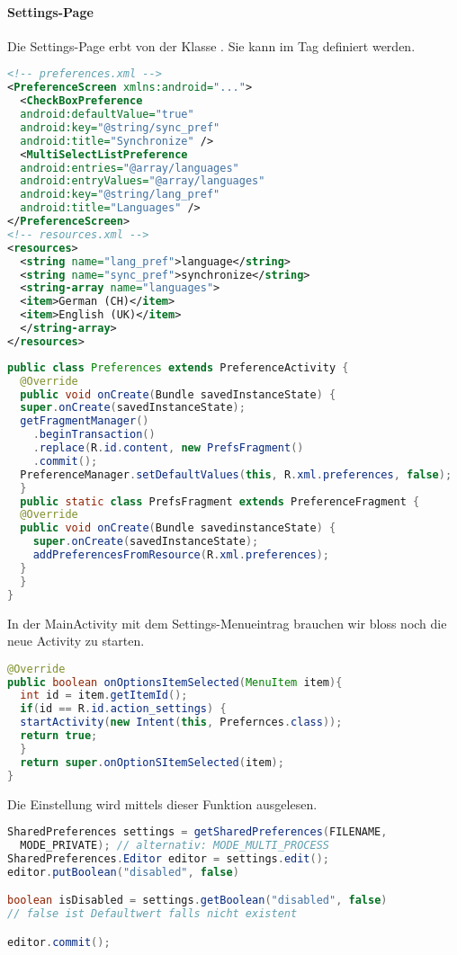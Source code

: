 \paragraph{Settings-Page} Die Settings-Page erbt von der Klasse . Sie kann im  Tag definiert werden.
\begin{lstlisting}[language=xml]
<!-- preferences.xml -->
<PreferenceScreen xmlns:android="...">
  <CheckBoxPreference
  android:defaultValue="true"
  android:key="@string/sync_pref"
  android:title="Synchronize" />
  <MultiSelectListPreference
  android:entries="@array/languages"
  android:entryValues="@array/languages"
  android:key="@string/lang_pref"
  android:title="Languages" />
</PreferenceScreen>
<!-- resources.xml -->
<resources>
  <string name="lang_pref">language</string>
  <string name="sync_pref">synchronize</string>
  <string-array name="languages">
  <item>German (CH)</item>
  <item>English (UK)</item>
  </string-array>
</resources>
\end{lstlisting}
\begin{lstlisting}[language=java]
public class Preferences extends PreferenceActivity {
  @Override
  public void onCreate(Bundle savedInstanceState) {
  super.onCreate(savedInstanceState);
  getFragmentManager()
    .beginTransaction()
    .replace(R.id.content, new PrefsFragment()
    .commit();
  PreferenceManager.setDefaultValues(this, R.xml.preferences, false);
  }
  public static class PrefsFragment extends PreferenceFragment {
  @Override
  public void onCreate(Bundle savedinstanceState) {
    super.onCreate(savedInstanceState);
    addPreferencesFromResource(R.xml.preferences);
  }
  }
}
\end{lstlisting}
In der MainActivity mit dem Settings-Menueintrag brauchen wir bloss noch die neue Activity zu starten.
\begin{lstlisting}[language=java]
@Override
public boolean onOptionsItemSelected(MenuItem item){
  int id = item.getItemId();
  if(id == R.id.action_settings) {
  startActivity(new Intent(this, Prefernces.class));
  return true;
  }
  return super.onOptionSItemSelected(item);
}
\end{lstlisting}
Die Einstellung wird mittels dieser Funktion ausgelesen.
\begin{lstlisting}[language=java]
SharedPreferences settings = getSharedPreferences(FILENAME, 
  MODE_PRIVATE); // alternativ: MODE_MULTI_PROCESS
SharedPreferences.Editor editor = settings.edit();
editor.putBoolean("disabled", false)

boolean isDisabled = settings.getBoolean("disabled", false)
// false ist Defaultwert falls nicht existent

editor.commit();
\end{lstlisting}
